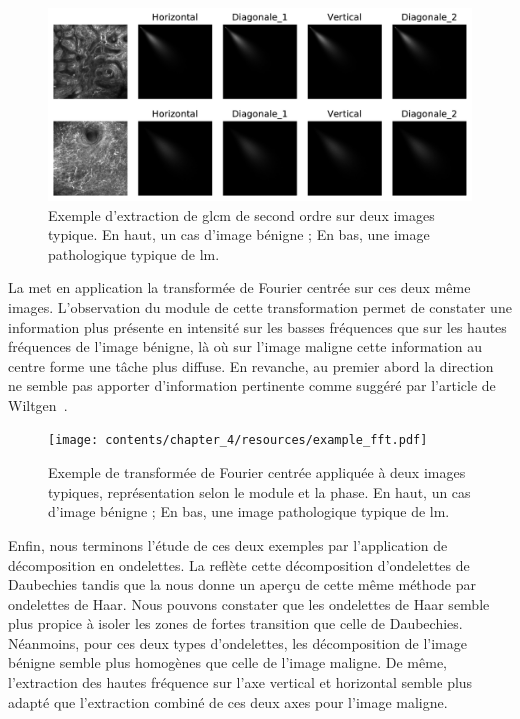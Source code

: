 \begin{figure}[H]
    \centering
    \includegraphics[width=\linewidth]{contents/chapter_4/resources/example_glcm.pdf}
    \caption{Exemple d'extraction de \gls{glcm} de second ordre sur deux images typique. En haut, un cas d'image bénigne ; En bas, une image pathologique typique de \gls{lm}.}
    \label{fig:example_glcm}
\end{figure}\par

La  met en application la transformée de Fourier centrée sur ces deux même images. L'observation du module de cette transformation permet de constater une information plus présente en intensité sur les basses fréquences que sur les hautes fréquences de l'image bénigne, là où sur l'image maligne cette information au centre forme une tâche plus diffuse. En revanche, au premier abord la direction ne semble pas apporter d'information pertinente comme suggéré par l'article de Wiltgen~\cite{Wiltgen2008}.\par

\begin{figure}[H]
    \centering
    \texttt{[image: contents/chapter\_4/resources/example\_fft.pdf]}
    \caption{Exemple de transformée de Fourier centrée appliquée à deux images typiques, représentation selon le module et la phase. En haut, un cas d'image bénigne ; En bas, une image pathologique typique de \gls{lm}.}
    \label{fig:example_fft}
\end{figure}\par

Enfin, nous terminons l'étude de ces deux exemples par l'application de décomposition en ondelettes. La  reflète cette décomposition d'ondelettes de Daubechies tandis que la  nous donne un aperçu de cette même méthode par ondelettes de Haar. Nous pouvons constater que les ondelettes de Haar semble plus propice à isoler les zones de fortes transition que celle de Daubechies. Néanmoins, pour ces deux types d'ondelettes, les décomposition de l'image bénigne semble plus homogènes que celle de l'image maligne. De même, l'extraction des hautes fréquence sur l'axe vertical et horizontal semble plus adapté que l'extraction combiné de ces deux axes pour l'image maligne.\par

